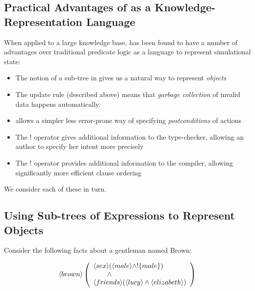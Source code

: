 \subsection{Practical Advantages of \ELABR{} as a Knowledge-Representation Language}

When applied to a large knowledge base, \ELFULL{} has been found to have a number of advantages over traditional predicate logic as a language to represent simulational state:
\begin{itemize}
\item
The notion of a sub-tree in \ELABR{} gives us a natural way to represent \emph{objects}
\item
The update rule (described above) means that \emph{garbage collection} of invalid data happens automatically.
\item
\ELABR{} allows a simpler less error-prone way of specifying \emph{postconditions} of actions
\item
The $!$ operator gives additional information to the type-checker, allowing an author to specify her intent more precisely
\item
The $!$ operator provides additional information to the compiler, allowing significantly more efficient clause ordering
\end{itemize}
We consider  each of these in turn.

\subsection{Using Sub-trees of Expressions to Represent Objects}
Consider the following facts about a gentleman named Brown:

\[
   \langle brown \rangle \left(
   \begin{array}{l}
     \langle sex \rangle (\langle male \rangle \land ! \{male\}) \\
        \qquad \land \\
     \langle friends \rangle (\langle lucy \rangle \land \langle elizabeth \rangle ) 
   \end{array}
   \right)
\]


